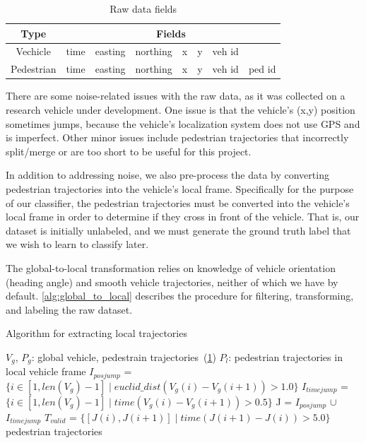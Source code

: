 \begin{table}[ht!]
\centering
\begin{tabular}{||c||c c c c c c c||}  
 \hline
 \multirow{1}{*}{Type} &
       \multicolumn{7}{c||}{Fields} \\
 \hline\hline
 Vechicle & time & easting & northing & x & y & veh id & \\ \hline
 Pedestrian & time & easting & northing & x & y & veh id & ped id \\ \hline
\end{tabular}
\caption{Raw data fields}
\label{table_data}
\end{table}

There are some noise-related issues with the raw data, as it was collected on a research vehicle under development.
One issue is that the vehicle's (x,y) position sometimes jumps, because the vehicle's localization system does not use GPS and is imperfect.
Other minor issues include pedestrian trajectories that incorrectly split/merge or are too short to be useful for this project.

In addition to addressing noise, we also pre-process the data by converting pedestrian trajectories into the vehicle's local frame.
Specifically for the purpose of our classifier, the pedestrian trajectories must be converted into the vehicle's local frame in order to determine if they cross in front of the vehicle.
That is, our dataset is initially unlabeled, and we must generate the ground truth label that we wish to learn to classify later.

The global-to-local transformation relies on knowledge of vehicle orientation (heading angle) and smooth vehicle trajectories, neither of which we have by default.
\cref{alg:global_to_local} describes the procedure for filtering, transforming, and labeling the raw dataset.

\begin{algorithm}\label{alg:global_to_local}
	\caption{Algorithm for extracting local trajectories}
	\begin{algorithmic}[1]
		\renewcommand{\algorithmicrequire}{\textbf{Input:}}
		\renewcommand{\algorithmicensure}{\textbf{Output:}}
		\REQUIRE $V_g$, $P_g$: global vehicle, pedestrain trajectories~(\cref{table_data})
		\ENSURE  $P_l$: pedestrian trajectories in local vehicle frame
			\STATE $I_{pos jump}$ = $\{i \in [1,len(V_g)-1] \mid euclid\_dist(V_g(i)-V_g(i+1))>1.0\}$
			\STATE $I_{time jump}$ = $\{i \in [1,len(V_g)-1] \mid time(V_g(i)-V_g(i+1))>0.5\}$
			\STATE J = $I_{pos jump}$ $\cup$ $I_{time jump}$
			\STATE $T_{valid}$ = $\{[J(i), J(i+1)] \mid time(J(i+1) - J(i)) > 5.0\}$
		\ENDFOR
		\RETURN pedestrian trajectories 
	\end{algorithmic} 
\end{algorithm}




